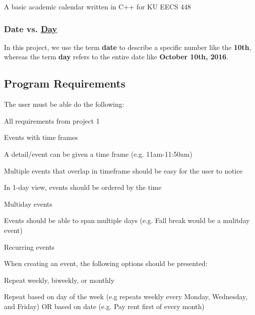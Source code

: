 A basic academic calendar written in C++ for KU E\+E\+CS 448

\subsubsection*{Date vs. \hyperlink{class_day}{Day}}

In this project, we use the term {\bfseries date} to describe a specific number like the {\bfseries 10th}, whereas the term {\bfseries day} refers to the entire date like {\bfseries October 10th, 2016}.

\subsection*{Program Requirements}

The user must be able do the following\+:
\begin{DoxyItemize}
\item All requirements from project 1
\item Events with time frames
\begin{DoxyItemize}
\item A detail/event can be given a time frame (e.\+g. 11am-\/11\+:50am)
\item Multiple events that overlap in timeframe should be easy for the user to notice
\item In 1-\/day view, events should be ordered by the time
\end{DoxyItemize}
\item Multiday events
\begin{DoxyItemize}
\item Events should be able to span multiple days (e.\+g. Fall break would be a mulitday event)
\end{DoxyItemize}
\item Recurring events
\begin{DoxyItemize}
\item When creating an event, the following options should be presented\+:
\begin{DoxyItemize}
\item Repeat weekly, biweekly, or monthly
\item Repeat based on day of the week (e.\+g repeats weekly every Monday, Wednesday, and Friday) OR based on date (e.\+g. Pay rent first of every month)
\end{DoxyItemize}
\end{DoxyItemize}
\end{DoxyItemize}

